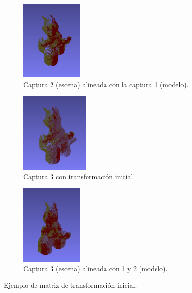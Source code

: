 \begin{figure}[h]
\begin{subfigure}[t]{0.2\textheight}
    	\centering
        \includegraphics[height=4cm]{archivos/ejemplo-acumulacion-transformacion-captura-2-alineada.png}
        \caption{Captura 2 (escena) alineada con la captura 1 (modelo).}
        \label{fig:ejemplo-acumulacion-transformacion-captura-2-alineada}
    \end{subfigure}
    \begin{subfigure}[t]{0.2\textheight}
    	\centering
        \includegraphics[height=4cm]{archivos/ejemplo-acumulacion-transformacion-captura-3-transformacion-inicial.png}
        \caption{Captura 3 con transformación inicial.}
        \label{fig:ejemplo-acumulacion-transformacion-captura-3-transformacion-inicial}
    \end{subfigure}
    \begin{subfigure}[t]{0.2\textheight}
    	\centering
        \includegraphics[height=4cm]{archivos/ejemplo-acumulacion-transformacion-captura-3-alineada.png}
        \caption{Captura 3 (escena) alineada con 1 y 2 (modelo).}
        \label{fig:ejemplo-acumulacion-transformacion-captura-3-alineada}
    \end{subfigure}
    \caption{Ejemplo de matriz de transformación inicial.}
    \label{fig:ejemplo-acumulacion-transformacion}
\end{figure}

